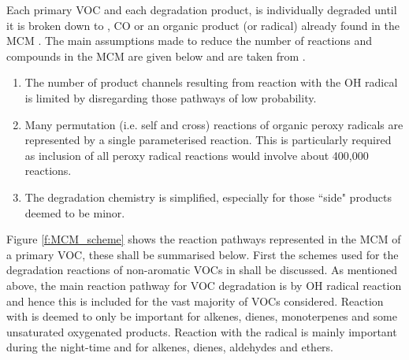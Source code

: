 Each primary VOC and each degradation product, is individually degraded until it is broken down to , CO or an organic 
product (or radical) already found in the MCM \citep{Jenkin:1997}. The main assumptions made to reduce the number of reactions 
and compounds in the MCM are given below and are taken from \citep{Jenkin:1997}.
\begin{enumerate}
    \item The number of product channels resulting from reaction with the OH radical is limited by disregarding those pathways 
        of low probability.
    \item Many permutation (i.e. self and cross) reactions of organic peroxy radicals are represented by a single parameterised
        reaction. This is particularly required as inclusion of all peroxy radical reactions would involve about 400,000 
        reactions.
    \item The degradation chemistry is simplified, especially for those ``side" products deemed to be minor.
\end{enumerate}
Figure \ref{f:MCM_scheme} shows the reaction pathways represented in the MCM of a primary VOC, these shall be summarised below.
First the schemes used for the degradation reactions of non-aromatic VOCs in \citep{Saunders:2003} shall be discussed. As 
mentioned above, the main reaction pathway for VOC degradation is by OH radical reaction and hence this is included for the 
vast majority of VOCs considered. Reaction with  is deemed to only be important for alkenes, dienes, monoterpenes and 
some unsaturated oxygenated products. Reaction with the  radical is mainly important during the night-time and for 
alkenes, dienes, aldehydes and ethers.  

